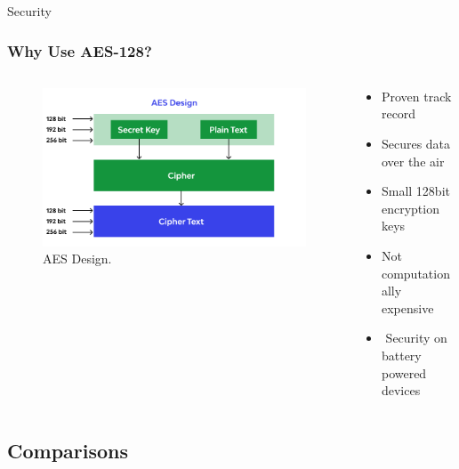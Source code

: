 \documentclass{beamer}
\begin{document}
  \begin{frame}{Security}
    \frametitle{Why Use AES-128?}
    \begin{columns}
      \begin{column}{0.5\textwidth}
        \begin{figure}[htbp]
          \centering
          \includegraphics[width=\textwidth]{AES128_structure.png}
          \caption{AES Design.\cite{Beschokov}}
          \label{fig:AES_Design}
        \end{figure}
      \end{column}
      \begin{column}{0.5\textwidth}
        \begin{itemize}
          \item Proven track record
          \item Secures data over the air
          \item Small 128bit encryption keys
          \item Not computationally expensive
          \item \faThumbsOUp$ $ Security on battery powered devices
        \end{itemize}
      \end{column}
    \end{columns}
  \end{frame}

\subsection{Comparisons}
\end{document}
